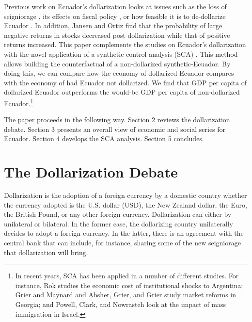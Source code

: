 \documentclass[12pt]{article}
\begin{document}
Previous work on Ecuador's dollarization looks at issues such as the loss of seigniorage \parencite{Lange2005}, its effects on fiscal policy \parencite{MariDelCristo2016}, or how feasible it is to de-dollarize Ecuador \parencite{JAMESON2003}. In addition, Jansen and Ortiz \parencite*{Jansen2007} find that the probability of large negative returns in stocks decreased post dollarization while that of positive returns increased. This paper complements the studies on Ecuador's dollarization with the novel application of a synthetic control analysis (SCA) \parencite{Abadie,Abadie2003,Abadie2015}. This method allows building the counterfactual of a non-dollarized synthetic-Ecuador. By doing this, we can compare how the economy of dollarized Ecuador compares with the economy of had Ecuador not dollarized. We find that GDP per capita of dollarized Ecuador outperforms the would-be GDP per capita of non-dollarized Ecuador.\footnote{In recent years, SCA has been applied in a number of different studies. For instance, Rok \parencite*{Spruk2019} studies the economic cost of institutional shocks to Argentina; Grier and Maynard \parencite*{Grier2016} and Absher, Grier, and Grier \parencite*{Absher2020} study market reforms in Georgia; and Powell, Clark, and Nowrasteh \parencite*{Powell2017} look at the impact of mass immigration in Israel.}

The paper proceeds in the following way. Section 2 reviews the dollarization debate. Section 3 presents an overall view of economic and social series for Ecuador. Section 4 develops the SCA analysis. Section 5 concludes.

\section{The Dollarization Debate}
    \label{sec:debate}

Dollarization is the adoption of a foreign currency by a domestic country whether the currency adopted is the U.S. dollar (USD), the New Zealand dollar, the Euro, the British Pound, or any other foreign currency. Dollarization can either by unilateral or bilateral. In the former case, the dollarizing country unilaterally decides to adopt a foreign currency. In the latter, there is an agreement with the central bank that can include, for instance, sharing some of the new seigniorage that dollarization will bring.
\end{document}
